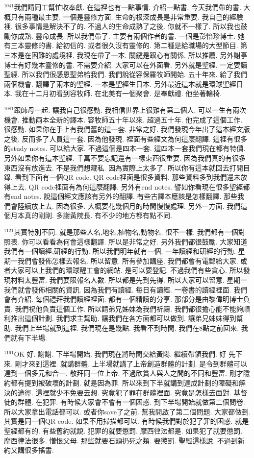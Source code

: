 \documentclass{book}
\begin{document}
$^{1041}$我們請同工幫忙收奉獻.
在這裡也有一點事情.
介紹一點書.
今天我們帶的書.
大概只有兩種最主要.
一個是靈修方面.
生命的根深成長是非常重要.
我自己的經驗裡.
很多事情是解決不了的.
不過人的生命成熟了之後.
你就不一樣了.
所以我也鼓勵你成熟.
靈命成長.
所以我們帶了.
主要有兩個作者的書.
一個是彭怡珍博士.
她有三本靈修的書.
給初信的.
或者很久沒有靈修的.
第二種是給職場的大型節目.
第三本是在困難的處境裡.
我現在帶了一本.
關鍵是跟心有關係.
所以推薦.
另外謝亭博士有好幾本靈修的書.
不需要介紹.
大家可以在外面看.
另外就是聖經.
一定要讀聖經.
所以我們很感恩聖弟給我們.
我們說從容保羅牧師開始.
五十年來.
給了我們兩個機會.
翻譯了兩本的聖經.
一本是聖經生日本.
另外最近這本就是環球聖經日本.
我在十二月初看到容牧師.
在北美有一個聚會.
是奉獻禮.
他坐著輪椅.

$^{1081}$跟師母一起.
讓我自己很感動.
我相信世界上很難有第二個人.
可以一生有兩次機會.
推動兩本全新的譯本.
容牧師五十年以來.
超過五十年.
他完成了這個工作.
很感動.
如果你在手上有我們舊的這一套.
非常之好.
我們發現今年出了這本經文版之後.
反而多了人買這一套.
因為他發現.
裡面有些經文為何這麼翻譯.
這裡有很多的study notes.
可以給大家.
不過這個是四本一套.
這四本一套我們現在都有特價.
另外如果你有這本聖經.
千萬不要忘記還有一樣東西很重要.
因為我們真的有很多東西沒有放進去.
不是我們想藏私.
因為實際上太多了.
所以你有這本就回去打開目錄.
看到下面有一個QR code.
QR code裡面是很多資料.
那些資料多到我們還未放得上去.
QR code裡面有為何這麼翻譯.
另外有end notes.
譬如你看現在很多聖經都有end notes.
說這個經文應該有另外的翻譯.
有些古譯本應該是怎樣翻譯.
那些我們會陸續放上去.
因為很多.
大概要花幾個月的時間慢慢處理.
另外一方面.
我們這個月本真的剛剛.
多謝黃院長.
有不少的地方都有點不同.

$^{1121}$其實特別不同.
就是那些人名,地名,植物名,動物名.
很不一樣.
我們都有一個對照表.
你可以看看為何會這樣翻譯.
所以是非常之好.
另外我們都很鼓勵.
大家知道我們有一個讀經,研經的行動.
所以我們明年就有一個.
一年讀經和研經的行動.
星期一我們會發佈怎樣去報名.
所以留意.
所有參加講座.
我們都會有電郵給大家.
或者大家可以上我們的環球醒工會的網站.
是可以要登記.
不過我們有些貪心.
所以發現材料太豐富.
我們要限報名人數.
所以都是先到先得.
所以大家可以留意.
星期一我們就會發佈相關的資訊.
因為我們有讀經.
每日有讀經.
一卷書的讀經裡面.
我們會有介紹.
每個禮拜我們讀經裡面.
都有一個精讀的分享.
那部分是由黎偉明博士負責.
我們祝他負責這個工作.
所以請弟兄姊妹為我們祈禱.
我們都很擔心能不能夠順利推出這個計劃.
我們求主幫助.
讓我們在各方面都可以做到.
讓弟兄姊妹得到幫助.
我們上半場就到這裡.
我們現在是幾點.
我看不到時間.
我們在8點之前回來.
我們就有下半場.

$^{1161}$OK 好.
謝謝.
下半場開始.
我們現在將時間交給黃陽.
繼續帶領我們.
好 先下來.
剛才來到這裡.
就講群體.
上半場就講了上帝創造群體的計劃.
是令到群體可以達到一個多元和合一.
敬拜同一位上帝.
不過欣賞人與人之間的不同和豐富.
剛才隱約都有提到被破壞的計劃.
就是因為罪.
所以來到下半就講到達成計劃的障礙和解決的途徑.
這裡就少不免要去想.
究竟犯了罪在群體裡面.
究竟是怎樣去面對.
基督徒的群體.
在犯罪.
有時候大家會不會有一個困惑.
到下半場開始就做第二個問卷.
所以大家拿出電話都可以.
或者你save了之前.
幫我開啟了第二個問題.
大家都做到.
其實是同一個QR code.
如果不用掃描都可以.
有時候我們對於犯了罪的困惑.
就是聖經都有的.
有些舊約就說.
犯罪的就要懲罰.
摩西律法都是.
如果犯了就要懲罰.
摩西律法很多.
憎恨父母.
那些就要石頭扔死之類.
要懲罰.
聖經這樣說.
不過到新約又講很多搖書.
\end{document}
